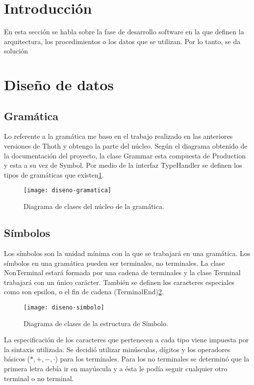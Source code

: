 
\section{Introducción}
En esta sección se habla sobre la fase de desarrollo software en la que definen la arquitectura, los procedimientos o los datos que se utilizan. Por lo tanto, se da solución

\section{Diseño de datos}

\subsection{Gramática}
Lo referente a la gramática me baso en el trabajo realizado en las anteriores versiones de Thoth\cite{thothv2} y obtengo la parte del núcleo. Según el diagrama obtenido de la documentación del proyecto, la clase Grammar esta compuesta de Production y esta a su vez de Symbol. Por medio de la interfaz TypeHandler se definen los tipos de gramáticas que existen\ref{fig:4.1}.

\begin{figure}[h]
\centering
\texttt{[image: diseno-gramatica]}
\caption{Diagrama de clases del núcleo de la gramática\cite{thothv2}.}
\label{fig:4.1}
\end{figure}


\subsection{Símbolos}

Los símbolos son la unidad mínima con la que se trabajará en una gramática. Los símbolos en una gramática pueden ser terminales, no terminales. La clase NonTerminal estará formada por una cadena de terminales y la clase Terminal trabajará con un único carácter. También se definen los caracteres especiales como son epsilon, o el fin de cadena (TerminalEnd)\ref{fig:4.2}.

\begin{figure}[h]
\centering
\texttt{[image: diseno-simbolo]}
\caption{Diagrama de clases de la estructura de Símbolo.}
\label{fig:4.2}
\end{figure}

La especificación de los caracteres que pertenecen a cada tipo viene impuesta por la sintaxis utilizada. Se decidió utilizar minúsculas, dígitos y los operadores básicos ($\ast,+,-,\cdot$) para los terminales. Para los no terminales se determinó que la primera letra debía ir en mayúscula y a ésta le podía seguir cualquier otro terminal o no terminal.

